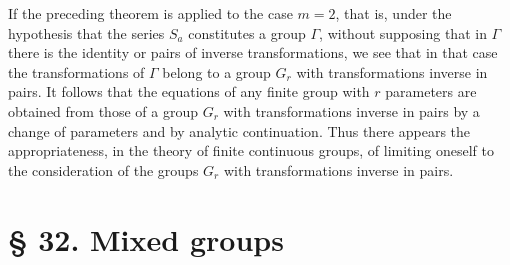 \documentclass[11pt]{book}
\begin{document}
If the preceding theorem is applied to the case $m=2$, that is, under the hypothesis that the series $S_a$ constitutes a group $\Gamma$, without supposing that in $\Gamma$ there is the identity or pairs of inverse transformations, we see that in that case the transformations of $\Gamma$ belong to a group $G_r$ with transformations inverse in pairs. It follows that the equations of any finite group with $r$ parameters are obtained from those of a group $G_r$ with transformations inverse in pairs by a change of parameters and by analytic continuation. Thus there appears the appropriateness, in the theory of finite continuous groups, of limiting oneself to the consideration of the groups $G_r$ with transformations inverse in pairs.

\section*{\S{} 32. Mixed groups}
\end{document}
